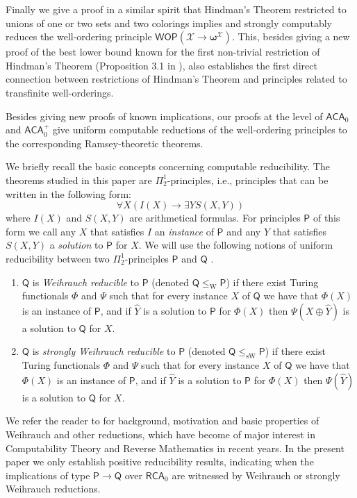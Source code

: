 \documentclass{amsart}
\newcommand\RCA{\mathsf{RCA}}
\newcommand\ACA{\mathsf{ACA}}
\newcommand\WOP{\mathsf{WOP}}
\newcommand\W{\mathrm{W}}
\newcommand\sW{\mathrm{sW}}
\newcommand{\LoX}{\mathcal{X}}
\newcommand\PP{\mathsf{P}}
\newcommand\Q{\mathsf{Q}}
\newcommand\boldomega{\pmb{\omega}}
\begin{document}
Finally we give a proof in a similar spirit that Hindman's Theorem restricted to unions of one or two sets
and two colorings implies and strongly computably reduces the well-ordering principle $\WOP(\LoX \to \boldomega^\LoX)$. This, besides giving a new proof of the best lower bound known for the first non-trivial restriction
of Hindman's Theorem (Proposition 3.1 in \cite{CKLZ:20}), also establishes the first direct connection between restrictions of Hindman's Theorem and principles related to transfinite well-orderings.

Besides giving new proofs of known implications, our proofs 
at the level of $\ACA_0$ and $\ACA_0^+$ give uniform computable reductions of the well-ordering principles to the corresponding Ramsey-theoretic theorems. 

We briefly recall the basic concepts concerning computable reducibility. The theorems studied in this paper are $\Pi^1_2$-principles, i.e., principles that can be written in the following form: 
$$ \forall X (I(X) \to \exists Y S(X,Y))$$
where $I(X)$ and $S(X,Y)$ are arithmetical formulas. For principles $\PP$ of this form we call any $X$ that satisfies
$I$ an {\em instance} of $\PP$ and any $Y$ that satisfies $S(X,Y)$ a {\em solution} to $\PP$ for $X$.
We will use the following notions of uniform reducibility between two $\Pi^1_2$-principles $\PP$ and $\Q$ .

\begin{enumerate}
\item $\Q$ is {\em Weihrauch reducible} to $\PP$ (denoted $\Q \leq_\W \PP$) if there exist Turing functionals $\Phi$ and $\Psi$ such 
that for every instance $X$ of $\Q$ we have that $\Phi(X)$ is an instance of $\PP$, and if $\hat{Y}$ is a solution to $\PP$ for $\Phi(X)$
then $\Psi(X\oplus \hat{Y})$ is a solution to $\Q$ for $X$.
\item $\Q$ is {\em strongly Weihrauch reducible} to $\PP$ (denoted $\Q \leq_{\sW} \PP$) if there exist Turing functionals $\Phi$ and $\Psi$ such 
that for every instance $X$ of $\Q$ we have that $\Phi(X)$ is an instance of $\PP$, and if $\hat{Y}$ is a solution to $\PP$ for $\Phi(X)$
then $\Psi(\hat{Y})$ is a solution to $\Q$ for $X$.
\end{enumerate}

We refer the reader to \cite{DDHMS:16} for background, motivation and basic properties of Weihrauch and other reductions, 
which have become of major interest in Computability Theory and Reverse Mathematics in recent years.
In the present paper we only establish positive reducibility results, indicating when the implications of type $\PP\to \Q$ over
$\RCA_0$ are witnessed by Weihrauch or strongly Weihrauch reductions.
\end{document}
